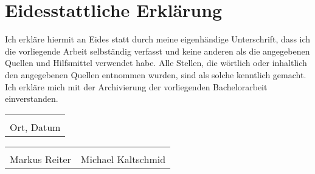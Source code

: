 \section*{Eidesstattliche Erkl{\"a}rung}

Ich erkl{\"a}re hiermit an Eides statt durch meine eigenh{\"a}ndige Unterschrift, dass ich die vorliegende Arbeit selbst{\"a}ndig verfasst und keine anderen als die angegebenen Quellen und Hilfsmittel verwendet habe. Alle Stellen, die w{\"o}rtlich oder inhaltlich den angegebenen Quellen entnommen wurden, sind als solche kenntlich gemacht. Ich erkl{\"a}re mich mit der Archivierung der vorliegenden Bachelorarbeit einverstanden.

\vspace{2.5cm}

\noindent\begin{tabular}{@{}>{\centering}p{2.75in}@{}}
\dotfill                         \tabularnewline
Ort, Datum\tabularnewline
\end{tabular}

\vspace{2cm}

\noindent\begin{tabular}{@{}>{\centering}p{2.75in}>{\centering}p{2.75in}@{}}
\dotfill                         & \dotfill     \tabularnewline
Markus Reiter & Michael Kaltschmid\tabularnewline
\end{tabular}